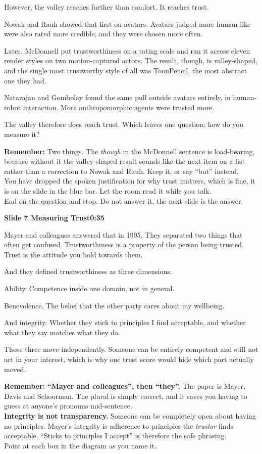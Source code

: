 \documentclass[11pt,a4paper]{article}
\newcommand{\slidehead}[3]{%
  \needspace{5\baselineskip}
  \vspace{0.9em}
  \noindent\colorbox{knblue}{\parbox{0.978\textwidth}{\vspace{1pt}\color{white}\textbf{Slide #1 \quad #2}\hfill\textbf{#3}\vspace{1pt}}}
  \vspace{0.35em}\par}
\newcommand{\remind}[1]{%
  \vspace{0.15em}
  \noindent\colorbox{knlight}{\parbox{0.972\textwidth}{\small\color{knblue}\textbf{Remember:} #1}}
  \vspace{0.2em}\par}
\begin{document}
However, the valley reaches further than comfort. It reaches trust.

Nowak and Rauh showed that first on avatars. Avatars judged more human-like were also rated more credible, and they were chosen more often.

Later, McDonnell put trustworthiness on a rating scale and ran it across eleven render styles on two motion-captured actors. The result, though, is valley-shaped, and the single most trustworthy style of all was ToonPencil, the most abstract one they had.

Natarajan and Gombolay found the same pull outside avatars entirely, in human-robot interaction. More anthropomorphic agents were trusted more.

The valley therefore does reach trust. Which leaves one question: how do you measure it?

\remind{Two things. The \emph{though} in the McDonnell sentence is load-bearing, because without it the valley-shaped result sounds like the next item on a list rather than a correction to Nowak and Rauh. Keep it, or say ``but'' instead.\\[0.4em] You have dropped the spoken justification for why trust matters, which is fine, it is on the slide in the blue bar. Let the room read it while you talk.\\[0.4em] End on the question and stop. Do not answer it, the next slide is the answer.}

\slidehead{7}{Measuring Trust}{0:35}

Mayer and colleagues answered that in 1995. They separated two things that often get confused. Trustworthiness is a property of the person being trusted. Trust is the attitude you hold towards them.

And they defined trustworthiness as three dimensions.

Ability. Competence inside one domain, not in general.

Benevolence. The belief that the other party cares about my wellbeing.

And integrity. Whether they stick to principles I find acceptable, and whether what they say matches what they do.

Those three move independently. Someone can be entirely competent and still not act in your interest, which is why one trust score would hide which part actually moved.

\remind{\textbf{``Mayer and colleagues'', then ``they''.} The paper is Mayer, Davis and Schoorman. The plural is simply correct, and it saves you having to guess at anyone's pronouns mid-sentence.\\[0.4em] \textbf{Integrity is not transparency.} Someone can be completely open about having no principles. Mayer's integrity is adherence to principles the \emph{trustor} finds acceptable. ``Sticks to principles I accept'' is therefore the safe phrasing.\\[0.4em] Point at each box in the diagram as you name it.}
\end{document}
